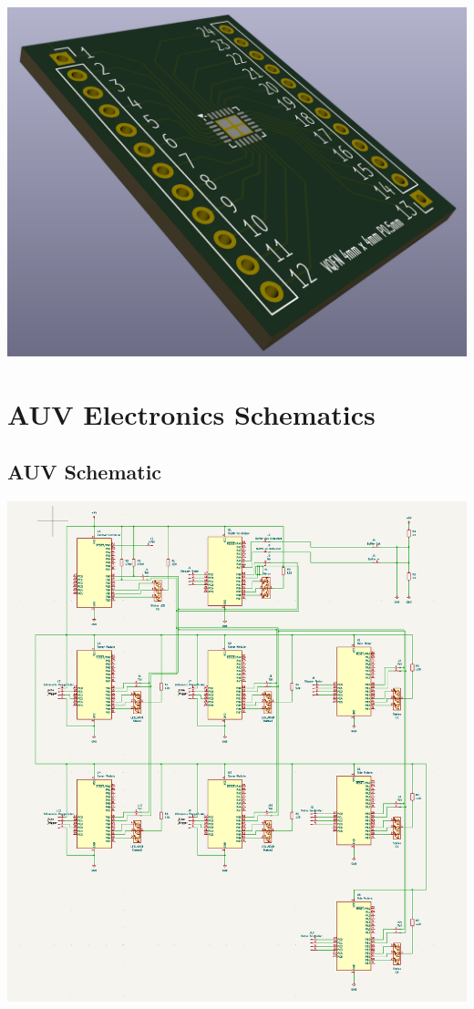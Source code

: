 \documentclass[11pt,a4paper,titlepage]{report}
\begin{document}
	\begin{center}
		\label{picture:breakout3}
		\includegraphics[width= \linewidth]{assets/breakout_pcb_3d.png}
	\end{center}
	
	\section{AUV Electronics Schematics}\label{appendix:auv_electronics_scematics}
	\subsection{AUV Schematic}\label{appendix:auv_schematic}
	\begin{center}
		\label{picture:auv_schematic}
		\includegraphics[width=\linewidth]{assets/AUVSchematic.png}
	\end{center}
\end{document}
